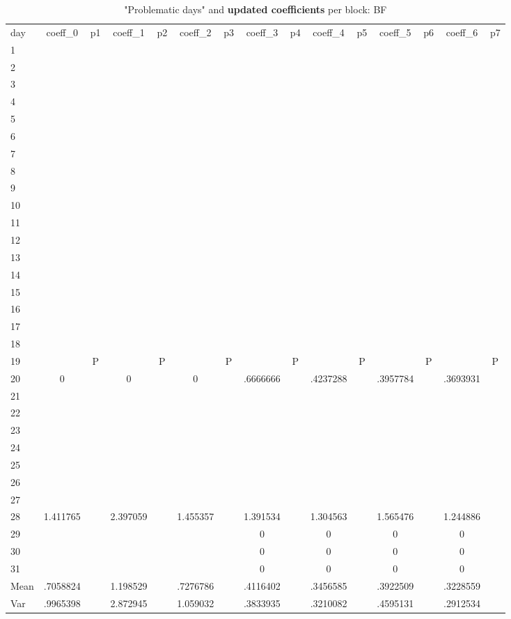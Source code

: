 \documentclass[a4paper,12pt]{article}
\begin{document}
\begin{landscape}
\begin{scriptsize}
\begin{center}
\begin{longtable}{l|cc|cc|cc|cc|cc|cc|cc|}
\caption{"Problematic days" and \textbf{updated coefficients} per block: BF\label{tab_bf_5}}
\hline
day&coeff\_0&p1&coeff\_1&p2&coeff\_2&p3&coeff\_3&p4&coeff\_4&p5&coeff\_5&p6&coeff\_6&p7 \\
1&&&&&&&&&&&&&& \\
2&&&&&&&&&&&&&& \\
3&&&&&&&&&&&&&& \\
4&&&&&&&&&&&&&& \\
5&&&&&&&&&&&&&& \\
6&&&&&&&&&&&&&& \\
7&&&&&&&&&&&&&& \\
8&&&&&&&&&&&&&& \\
9&&&&&&&&&&&&&& \\
10&&&&&&&&&&&&&& \\
11&&&&&&&&&&&&&& \\
12&&&&&&&&&&&&&& \\
13&&&&&&&&&&&&&& \\
14&&&&&&&&&&&&&& \\
15&&&&&&&&&&&&&& \\
16&&&&&&&&&&&&&& \\
17&&&&&&&&&&&&&& \\
18&&&&&&&&&&&&&& \\
19&&P&&P&&P&&P&&P&&P&&P \\
20&0&&0&&0&&.6666666&&.4237288&&.3957784&&.3693931& \\
21&&&&&&&&&&&&&& \\
22&&&&&&&&&&&&&& \\
23&&&&&&&&&&&&&& \\
24&&&&&&&&&&&&&& \\
25&&&&&&&&&&&&&& \\
26&&&&&&&&&&&&&& \\
27&&&&&&&&&&&&&& \\
28&1.411765&&2.397059&&1.455357&&1.391534&&1.304563&&1.565476&&1.244886& \\
29&&&&&&&0&&0&&0&&0& \\
30&&&&&&&0&&0&&0&&0& \\
31&&&&&&&0&&0&&0&&0& \\ \hline
Mean&.7058824&&1.198529&&.7276786&&.4116402&&.3456585&&.3922509&&.3228559& \\
Var&.9965398&&2.872945&&1.059032&&.3833935&&.3210082&&.4595131&&.2912534& \\ \hline
\end{longtable}
\end{center}
\end{scriptsize}
\end{landscape}
\end{document}
